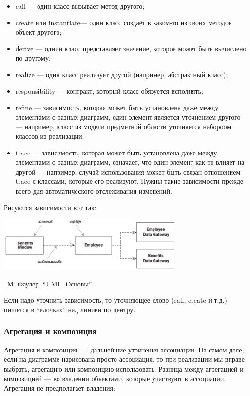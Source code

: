 \documentclass[a5paper]{article}
\newcommand{\attribution}[1] {
	\vspace{-5mm}\begin{flushright}\begin{scriptsize}%
	{\textcopyright\, #1}\end{scriptsize}\end{flushright}
}
\begin{document}
\begin{itemize}
	\item call --- один класс вызывает метод другого;
	\item create или instantiate--- один класс создаёт в каком-то из своих методов объект другого;
	\item derive --- однин класс представляет значение, которое может быть вычислено по другому;
	\item realize --- один класс реализует другой (например, абстрактный класс);
	\item responsibility --- контракт, который класс обязуется исполнять;
	\item refine --- зависимость, которая может быть установлена даже между элементами с разных диаграмм, один элемент является уточнением другого --- например, класс из модели предметной области уточняется набороом классов из реализации;
	\item trace --- зависимость, которая может быть установлена даже между элементами с разных диаграмм, означает, что один элемент как-то влияет на другой --- например, случай использования может быть связан отношением trace с классами, которые его реализуют. Нужны такие зависимости прежде всего для автоматического отслеживания изменений.
\end{itemize}

Рисуются зависимости вот так:

\begin{center}
	\includegraphics[width=0.7\textwidth]{dependencies.png}
	\attribution{М. Фаулер. ``UML. Основы''}
\end{center}

Если надо уточнить зависимость, то уточняющее слово (call, create и т.д.) пишется в ``ёлочках'' над линией по центру.

\subsubsection{Агрегация и композиция}

Агрегация и композиция ---- дальнейшие уточнения ассоциации. На самом деле, если на диаграмме нарисована просто ассоциация, то при реализации мы вправе выбрать, агрегацию или композицию использовать. Разница между агрегацией и композицией --- во владении объектами, которые участвуют в ассоциации. Агрегация не предполагает владения:
\end{document}
